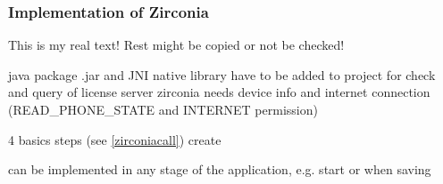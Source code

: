 \subsubsection{Implementation of Zirconia} \label{subsection:license-samsung-implementation}
This is my real text! Rest might be copied or not be checked!

%
java package .jar and JNI native library have to be added to project
for check and query of license server zirconia needs device info and internet connection (READ\_PHONE\_STATE and INTERNET permission)

4 basics steps (see \ref{zirconiacall})
create

can be implemented in any stage of the application, e.g. start or when saving

\cite{samsungZirconia}
%




